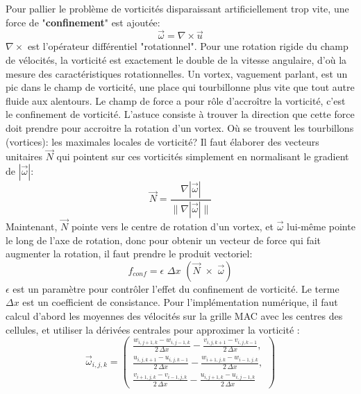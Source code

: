 \documentclass[11pt]{article}
\begin{document}
Pour pallier le problème de vorticités disparaissant artificiellement trop vite, une force de "\textbf{confinement}" est ajoutée:
\begin{equation}
\overrightarrow{\omega} = \nabla \times \overrightarrow{u}
\end{equation}
$\nabla \times$ est l'opérateur différentiel "rotationnel". Pour une rotation rigide du champ de vélocités, la vorticité est exactement le double de la vitesse angulaire, d'où la mesure des caractéristiques rotationnelles. Un vortex, vaguement parlant, est un pic dans le champ de vorticité, une place qui tourbillonne plus vite que tout autre fluide aux alentours.\newline
Le champ de force a pour rôle d'accroître la vorticité, c'est le confinement de vorticité. L'astuce consiste à trouver la direction que cette force doit prendre pour accroitre la rotation d'un vortex.\newline
Où se trouvent les tourbillons (vortices): les maximales locales de vorticité? Il faut élaborer des vecteurs unitaires $\overrightarrow{N}$ qui pointent sur ces vorticités simplement en normalisant le gradient de $ |\overrightarrow{\omega}|$:
\begin{equation}
\overrightarrow{N} = \frac{\nabla |\overrightarrow{\omega}|}{\| \nabla |\overrightarrow{\omega}| \|}
\end{equation}
Maintenant, $\overrightarrow{N}$ pointe vers le centre de rotation d'un vortex, et $\overrightarrow{\omega}$ lui-même pointe le long de l'axe de rotation, donc pour obtenir un vecteur de force qui fait augmenter la rotation, il faut prendre le produit vectoriel:
\begin{equation}
f_{conf} = \epsilon \,\, \Delta x \,\, (\overrightarrow{N} \,\, \times \,\, \overrightarrow{\omega})
\end{equation}
$\epsilon$ est un paramètre pour contrôler l'effet du confinement de vorticité. Le terme $\Delta x$ est un coefficient de consistance.\newline
Pour l'implémentation numérique, il faut calcul d'abord les moyennes des vélocités sur la grille MAC avec les centres des cellules, et utiliser la dérivées centrales pour approximer la vorticité :
\begin{equation}
\overrightarrow{\omega}_{i,j,k} = 
	\left(
		\begin{array}{c}
			\frac{w_{i,j+1,k} - w_{i,j-1,k}}{2\,\Delta x} - \frac{v_{i,j,k+1} - v_{i,j,k-1}}{2\,\Delta x}, \\
			\frac{u_{i,j,k+1} - u_{i,j,k-1}}{2\,\Delta x} - \frac{w_{i+1,j,k} - w_{i-1,j,k}}{2\,\Delta x}, \\
	 		\frac{v_{i+1,j,k} - v_{i-1,j,k}}{2\,\Delta x} - \frac{u_{i,j+1,k} - u_{i,j-1,k}}{2\,\Delta x}
		\end{array}
	\right)
\end{equation}
\end{document}
